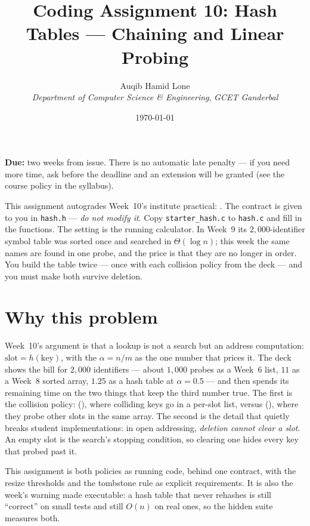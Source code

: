 \documentclass[11pt]{article}
\title{Coding Assignment 10: Hash Tables --- Chaining and Linear Probing}
\author{Auqib Hamid Lone\\[0.3em]
  \emph{Department of Computer Science \& Engineering}, \emph{GCET Ganderbal}}
\date{\today}
\begin{document}
\maketitle

\noindent\textbf{Due:} two weeks from issue. There is no automatic late penalty --- if you need more time, ask before the deadline and an extension will be granted (see the course policy in the syllabus).

\noindent This assignment autogrades Week~10's institute practical: . The contract is given to you in \texttt{hash.h} --- \emph{do not modify it}. Copy \texttt{starter\_hash.c} to \texttt{hash.c} and fill in the functions. The setting is the running calculator. In Week~9 its $2{,}000$-identifier symbol table was sorted once and searched in $\Theta(\log n)$; this week the same names are found in one probe, and the price is that they are no longer in order. You build the table twice --- once with each collision policy from the deck --- and you must make both survive deletion.

\section{Why this problem}

Week~10's argument is that a lookup is not a search but an address computation: $\text{slot} = h(\text{key})$, with the  $\alpha = n/m$ as the one number that prices it. The deck shows the bill for $2{,}000$ identifiers --- about $1{,}000$ probes as a Week~6 list, $11$ as a Week~8 sorted array, $1.25$ as a hash table at $\alpha = 0.5$ --- and then spends its remaining time on the two things that keep the third number true. The first is the collision policy:  (), where colliding keys go in a per-slot list, versus  (), where they probe other slots in the same array. The second is the detail that quietly breaks student implementations: in open addressing, \emph{deletion cannot clear a slot}. An empty slot is the search's stopping condition, so clearing one hides every key that probed past it.

This assignment is both policies as running code, behind one contract, with the resize thresholds and the tombstone rule as explicit requirements. It is also the week's warning made executable: a hash table that never rehashes is still ``correct'' on small tests and still $O(n)$ on real ones, so the hidden suite measures both.
\end{document}
